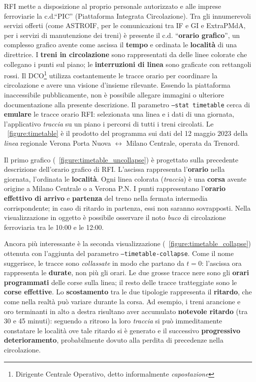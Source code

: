 \documentclass[12pt,italian]{report}
\begin{document}
RFI mette a disposizione al proprio personale autorizzato e alle
imprese ferroviarie la c.d.\@ ``PIC'' (Piattaforma Integrata
Circolazione).  Tra gli innumerevoli servizi offerti \cite{RfiPic}
(come ASTROIF, per le comunicazioni tra IF e GI e ExtraPMdA, per i
servizi di manutenzione dei treni) è presente il c.d.\@
``\textbf{orario grafico}'', un complesso grafico avente come ascissa
il \textbf{tempo} e ordinata le \textbf{località} di una direttrice.
I \textbf{treni in circolazione} sono rappresentati da delle linee
colorate che collegano i punti sul piano; le \textbf{interruzioni di
    linea} sono graficate con rettangoli rossi.  Il
DCO\footnote{Dirigente Centrale Operativo, detto informalmente
    \textit{capostazione}} utilizza costantemente le tracce orario per
coordinare la circolazione e avere una visione d'insieme rilevante.
Essendo la piattaforma inaccessibile pubblicamente, non è possibile
allegare immagini o ulteriore documentazione alla presente
descrizione.  Il parametro \texttt{--stat timetable} cerca di
\textbf{emulare} le tracce orario RFI: selezionata una linea e i dati
di una giornata, l'applicativo \textit{traccia} su un piano i percorsi
di tutti i treni circolati.  Le \figurename~\ref{figure:timetable} è
il prodotto del programma sui dati del 12 maggio 2023 della
\textit{linea} regionale Verona Porta Nuova $\leftrightarrow$ Milano
Centrale, operata da Trenord.

Il primo grafico (\figurename~\ref{figure:timetable_uncollapse}) è
progettato sulla precedente descrizione dell'orario grafico di RFI.
L'ascissa rappresenta l'\textbf{orario} nella giornata, l'ordinata le
\textbf{località}.  Ogni linea colorata (\textit{traccia}) è una
\textbf{corsa} avente origine a Milano Centrale o a Verona P.N\@.  I
punti rappresentano l'\textbf{orario effettivo di arrivo} e
\textbf{partenza} del treno nella fermata intermedia corrispondente;
in caso di ritardo in partenza, essi non saranno sovrapposti.  Nella
visualizzazione in oggetto è possibile osservare il noto \textit{buco}
di circolazione ferroviaria tra le 10:00 e le 12:00.

Ancora più interessante è la seconda visualizzazione
(\figurename~\ref{figure:timetable_collapse}) ottenuta con l'aggiunta
del parametro \texttt{--timetable-\-collapse}.  Come il nome
suggerisce, le tracce sono \textit{collassate} in modo che partano da
$t = 0$: l'ascissa ora rappresenta le \textbf{durate}, non più gli
orari.  Le due grosse tracce nere sono gli \textbf{orari programmati}
delle corse sulla linea; il resto delle tracce tratteggiate sono le
\textbf{corse effettive}.  Lo \textbf{scostamento} tra le due
tipologie rappresenta il \textbf{ritardo}, che come nella realtà può
variare durante la corsa.  Ad esempio, i treni arancione e oro
terminanti in alto a destra risultano aver accumulato \textbf{notevole
    ritardo} (tra 30 e 45 minuti): seguendo a ritroso la loro
\textit{traccia} si può immeditamente constatare le località ove tale
ritardo si è generato e il successivo \textbf{progressivo
    deterioramento}, probabilmente dovuto alla perdita di precedenze
nella circolazione.
\end{document}
